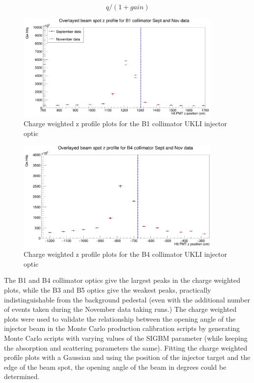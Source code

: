 \begin{equation}
    q/(1 + gain)
\label{eq:gain_correction}
\end{equation}

\begin{figure}
    \centering
    \includegraphics[width=0.9\textwidth]{Figures/charge_weighted_nov_sept_B1.PNG}
    \caption{Charge weighted z profile plots for the B1 collimator UKLI injector optic}
    \label{fig:charge_weighted_nov_sept_B1}
\end{figure}

\begin{figure}
    \centering
    \includegraphics[width=0.9\textwidth]{Figures/charge_weighted_nov_sept_B4.PNG}
    \caption{Charge weighted z profile plots for the B4 collimator UKLI injector optic}
    \label{fig:charge_weighted_nov_sept_B4}
\end{figure}

The B1 and B4 collimator optics give the largest peaks in the charge weighted plots, while the B3 and B5 optics give the weakest peaks, practically indistinguishable from the background pedestal (even with the additional number of events taken during the November data taking runs.) The charge weighted plots were used to validate the relationship between the opening angle of the injector beam in the Monte Carlo production calibration scripts by generating Monte Carlo scripts with varying values of the SIGBM parameter (while keeping the absorption and scattering parameters the same). Fitting the charge weighted profile plots with a Gaussian and using the position of the injector target and the edge of the beam spot, the opening angle of the beam in degrees could be determined.

